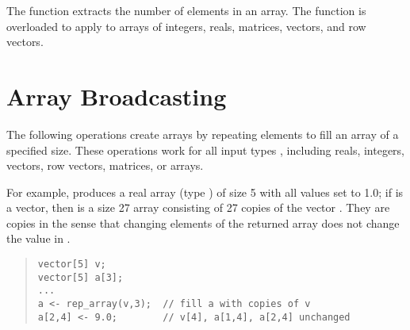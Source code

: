 The  function extracts the number of elements in an
array.  The function is overloaded to apply to arrays of integers,
reals, matrices, vectors, and row vectors.

\begin{description}
%
\end{description}


\section{Array Broadcasting}

The following operations create arrays by repeating elements to fill
an array of a specified size.  These operations work for all input
types , including reals, integers, vectors, row vectors,
matrices, or arrays.
%
\begin{description}
%
%
\end{description}
%
For example,  produces a real array (type
) of size 5 with all values set to 1.0; if  is a
vector, then  is a size 27 array consisting of
27 copies of the vector .  They are copies in the sense that
changing elements of the returned array does not change the value in
.  
%
\begin{quote}
\begin{Verbatim}
vector[5] v;
vector[5] a[3];
...
a <- rep_array(v,3);  // fill a with copies of v
a[2,4] <- 9.0;        // v[4], a[1,4], a[2,4] unchanged
\end{Verbatim}
\end{quote}

